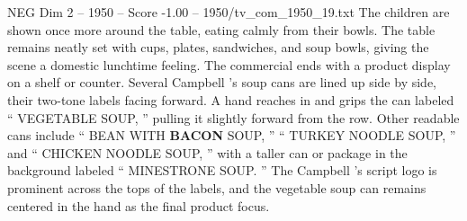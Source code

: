 \begin{textsample}{NEG Dim 2 – 1950 – Score -1.00 – 1950/tv\_com\_1950\_19.txt}
The children are shown once more around the table, eating calmly from their bowls.
The table remains neatly set with cups, plates, sandwiches, and soup bowls, giving the scene a domestic lunchtime feeling.
The commercial ends with a product display on a shelf or counter.
Several Campbell ’s soup cans are lined up side by side, their two-tone labels facing forward.
A hand reaches in and grips the can labeled “ VEGETABLE SOUP, ” pulling it slightly forward from the row.
Other readable cans include “ BEAN WITH \textbf{BACON} SOUP, ” “ TURKEY NOODLE SOUP, ” and “ CHICKEN NOODLE SOUP, ” with a taller can or package in the background labeled “ MINESTRONE SOUP. ” The Campbell ’s script logo is prominent across the tops of the labels, and the vegetable soup can remains centered in the hand as the final product focus.

\end{textsample}
